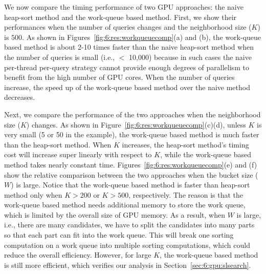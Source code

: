We now compare the timing performance of two GPU approaches: the naive heap-sort method and the work-queue based method. First, we show their performances when the number of queries changes and the neighborhood size ($K$) is $500$. As shown in Figures~\ref{fig:6:res:workqueuecomp}(a) and (b), the work-queue based method is about 2-10 times faster than the naive heap-sort method when the number of queries is small (i.e., $<$ 10,000) because in such cases the naive per-thread per-query strategy cannot provide enough degrees of parallelism to benefit from the high number of GPU cores. When the number of queries increase, the speed up of the work-queue based method over the naive method decreases.

Next, we compare the performance of the two approaches when the neighborhood size ($K$) changes. As shown in Figure~\ref{fig:6:res:workqueuecomp}(c)(d), unless $K$ is very small (5 or 50 in the example), the work-queue based method is much faster than the heap-sort method. When $K$ increases, the heap-sort method's timing cost will increase super linearly with respect to $K$, while the work-queue based method takes nearly constant time. Figures~\ref{fig:6:res:workqueuecomp}(e) and (f) show the relative comparison between the two approaches when the bucket size ($W$) is large. Notice that the work-queue based method is faster than heap-sort method only when $K > 200$ or $K > 500$, respectively. The reason is that the work-queue based method needs additional memory to store the work queue, which is limited by the overall size of GPU memory. As a result, when $W$ is large, i.e., there are many candidates, we have to split the candidates into many parts so that each part can fit into the work queue. This will break one sorting computation on a work queue into multiple sorting computations, which could reduce the overall efficiency. However, for large $K$, the work-queue based method is still more efficient, which verifies our analysis in Section~\ref{sec:6:gpu:slsearch}.

